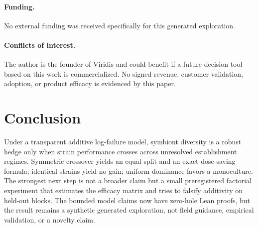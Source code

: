\documentclass[10pt,twocolumn]{article}
\begin{document}
\paragraph{Funding.}
No external funding was received specifically for this generated exploration.

\paragraph{Conflicts of interest.}
The author is the founder of Viridis and could benefit if a future decision
tool based on this work is commercialized. No signed revenue, customer
validation, adoption, or product efficacy is evidenced by this paper.

\section{Conclusion}

Under a transparent additive log-failure model, symbiont diversity is a robust
hedge only when strain performance crosses across unresolved establishment
regimes. Symmetric crossover yields an equal split and an exact dose-saving
formula; identical strains yield no gain; uniform dominance favors a
monoculture. The strongest next step is not a broader claim but a small
preregistered factorial experiment that estimates the efficacy matrix and
tries to falsify additivity on held-out blocks. The bounded model claims now
have zero-hole Lean proofs, but the result remains a synthetic generated
exploration, not field guidance, empirical validation, or a novelty claim.
\end{document}
